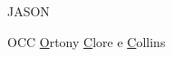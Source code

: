 \begin{listofabbrv}{JASON}
        \item[OCC] \underline{O}rtony \underline{C}lore e \underline{C}ollins
\end{listofabbrv}
